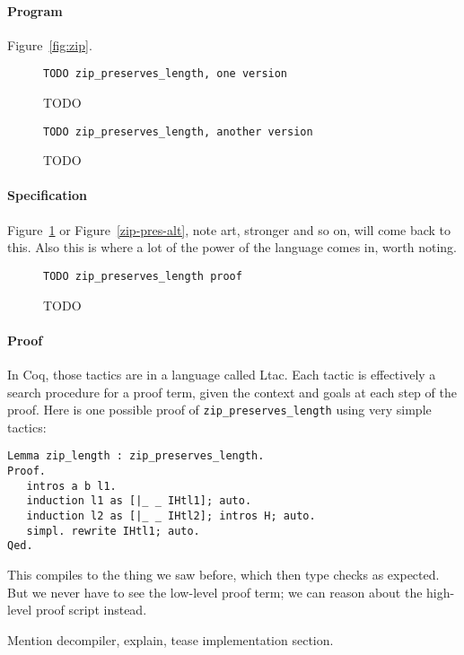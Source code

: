 \paragraph{Program} Figure~\ref{fig:zip}.

\begin{figure}
\begin{lstlisting}
TODO zip_preserves_length, one version
\end{lstlisting}
\caption{TODO}
\label{fig:zip-pres}
\end{figure}

\begin{figure}
\begin{lstlisting}
TODO zip_preserves_length, another version
\end{lstlisting}
\caption{TODO}
\label{fig:zip-pres-alt}
\end{figure}

\paragraph{Specification} Figure~\ref{fig:zip-pres} or Figure~\ref{zip-pres-alt}, note art, stronger and so on, will come back to this.
Also this is where a lot of the power of the language comes in, worth noting.

\begin{figure}
\begin{lstlisting}
TODO zip_preserves_length proof
\end{lstlisting}
\caption{TODO}
\label{fig:zip-pres-proof}
\end{figure}

\paragraph{Proof} 
In Coq, those tactics are in a language called Ltac.
Each tactic is effectively a search procedure for a proof term, given the context and goals at each step of the proof.
Here is one possible proof of \lstinline{zip_preserves_length} using very simple tactics:
\begin{lstlisting}
Lemma zip_length : zip_preserves_length.
Proof.
   intros a b l1.
   induction l1 as [|_ _ IHtl1]; auto.
   induction l2 as [|_ _ IHtl2]; intros H; auto.
   simpl. rewrite IHtl1; auto.
Qed.
\end{lstlisting}
This compiles to the thing we saw before, which then type checks as expected.
But we never have to see the low-level proof term; we can reason about the high-level proof script instead.

Mention decompiler, explain, tease implementation section.




